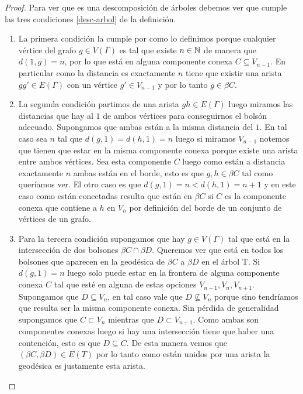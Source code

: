 \documentclass[tesis.tex]{subfiles}
\begin{document}
\begin{proof}
Para ver que es una descomposición de árboles debemos ver que cumple las tres condiciones \ref{desc-arbol} de la definición. 
\begin{enumerate}
	\item La primera condición la cumple por como lo definimos porque cualquier vértice del grafo $g \in V(\Gamma)$ 
	es tal que existe $n \in \mathbb N$ de manera que $d(1,g)=n$, por lo que está en alguna componente conexa $C \subseteq V_{n-1}$. 
	En particular como la distancia es exactamente $n$ tiene que existir una arista $gg' \in E(\Gamma)$ con un vértice $g' \in V_{n-1}$ y por lo tanto $g \in \beta C$.
	
	\item La segunda condición partimos de una arista $gh \in E(\Gamma)$ luego miramos las distancias que hay al $1$ de ambos vértices para conseguirnos el bolsón adecuado. 
	Supongamos que ambas están a la misma distancia del $1$. En tal caso sea $n$ tal que $d(g,1)=d(h,1)=n$ luego si miramos $V_{n-1}$ notemos que tienen que estar en la misma componente conexa porque existe una arista entre ambos vértices. Sea esta componente $C$ luego como están a distancia exactamente $n$ ambas están en el borde, esto es que $g,h \in \beta C$ tal como queríamos ver. 
	El otro caso es que $d(g,1)=n < d(h,1)=n+1$ y en este caso como están conectadas resulta que están en $\beta C$ si $C$ es la componente conexa que contiene a $h$ en $V_n$ por definición del borde de un conjunto de vértices de un grafo.
	
	\item Para la tercera condición supongamos que hay $g \in V(\Gamma)$ tal que está en la intersección de dos bolsones $\beta C \cap \beta D$. 
	Queremos ver que está en todos los bolsones que aparecen en la geodésica de $\beta C$ a $\beta D$ en el árbol T. 
	Si $d(g,1) = n$ luego solo puede estar en la frontera de alguna componente conexa $C$ tal que esté en alguna de estas opciones  $V_{n-1}, V_{n},  V_{n+1}$. 
	Supongamos que $D \subseteq V_{n}$, en tal caso vale que $D \nsubseteq V_{n}$ porque sino tendríamos que resulta ser la misma componente conexa. 
	Sin pérdida de generalidad supongamos que $C \subset V_n$ mientras que $D \subset V_{n+1}$. 
	Como ambas son componentes conexas luego si hay una intersección tiene que haber una contención, esto es que $D \subseteq C$. 
	De esta manera vemos que $(\beta C, \beta D) \in E(T)$ por lo tanto como están unidos por una arista la geodésica es justamente esta arista.
	
\end{enumerate}




\end{proof}
\end{document}
